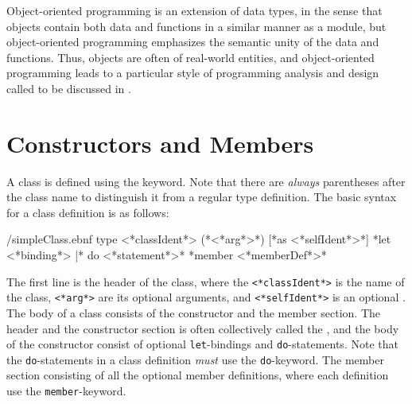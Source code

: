 \documentclass[fsharpNotes.tex]{subfiles}
\begin{document}
Object-oriented programming is an extension of data types, in the sense that objects contain both data and functions in a similar manner as a module, but object-oriented programming emphasizes the semantic unity of the data and functions. Thus, objects are often  of real-world entities, and object-oriented programming leads to a particular style of programming analysis and design called  to be discussed in . 

\section{Constructors and Members}
\label{sec:constructor}
A class is defined using the  keyword. Note that there are \emph{always} parentheses after the class name to distinguish it from a regular type definition. The basic syntax for a class definition is as follows:%
%
\begin{verbatimwrite}{\ebnf/simpleClass.ebnf}
type <*classIdent*> ({*<*arg*>*}) [*as <*selfIdent*>*] 
  {*let <*binding*> |* do <*statement*>*}
  {*member <*memberDef*>*}
\end{verbatimwrite}
%
The first line is the header of the class, where the \lstinline[language=syntax]{<*classIdent*>} is the name of the class, \lstinline[language=syntax]{<*arg*>} are its optional arguments, and \lstinline[language=syntax]{<*selfIdent*>} is an optional . The body of a class consists of the constructor and the member section. The header and the constructor section is often collectively called the , and the body of the constructor consist of optional \lstinline{let}-bindings and \lstinline{do}-statements. Note that the \lstinline{do}-statements in a class definition \emph{must} use the \lstinline{do}-keyword. The member section consisting of all the optional member definitions, where each definition use the \lstinline{member}-keyword.

\end{document}
